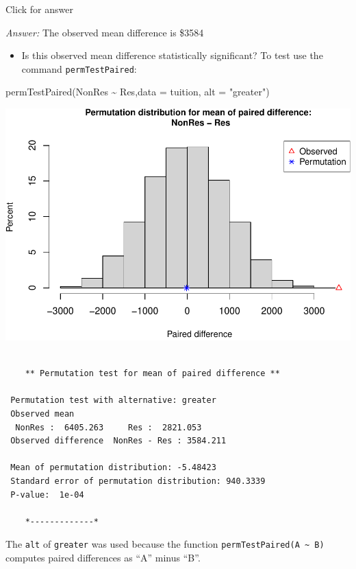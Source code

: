 \documentclass[
]{book}
\newenvironment{Shaded}{\begin{snugshade}}{\end{snugshade}}
\newcommand{\AttributeTok}[1]{\textcolor[rgb]{0.77,0.63,0.00}{#1}}
\newcommand{\FunctionTok}[1]{\textcolor[rgb]{0.00,0.00,0.00}{#1}}
\newcommand{\NormalTok}[1]{#1}
\newcommand{\SpecialCharTok}[1]{\textcolor[rgb]{0.00,0.00,0.00}{#1}}
\newcommand{\StringTok}[1]{\textcolor[rgb]{0.31,0.60,0.02}{#1}}
\providecommand{\tightlist}{%
  \setlength{\itemsep}{0pt}\setlength{\parskip}{0pt}}
\begin{document}
Click for answer

\emph{Answer:} The observed mean difference is \$3584

\begin{itemize}
\tightlist
\item
  Is this observed mean difference statistically significant? To test use the command \texttt{permTestPaired}:
\end{itemize}

\begin{Shaded}
\begin{Highlighting}[]
\FunctionTok{permTestPaired}\NormalTok{(NonRes }\SpecialCharTok{\textasciitilde{}}\NormalTok{ Res,}\AttributeTok{data =}\NormalTok{ tuition, }\AttributeTok{alt =} \StringTok{"greater"}\NormalTok{)}
\end{Highlighting}
\end{Shaded}

\includegraphics[width=1\linewidth]{Class_Activity_13_files/figure-latex/unnamed-chunk-5-1}

\begin{verbatim}

    ** Permutation test for mean of paired difference **

 Permutation test with alternative: greater 
 Observed mean
  NonRes :  6405.263     Res :  2821.053 
 Observed difference  NonRes - Res : 3584.211 

 Mean of permutation distribution: -5.48423 
 Standard error of permutation distribution: 940.3339 
 P-value:  1e-04 

    *-------------*
\end{verbatim}

The \texttt{alt} of \texttt{greater} was used because the function \texttt{permTestPaired(A\ \textasciitilde{}\ B)} computes paired differences as ``A'' minus ``B''.
\end{document}
